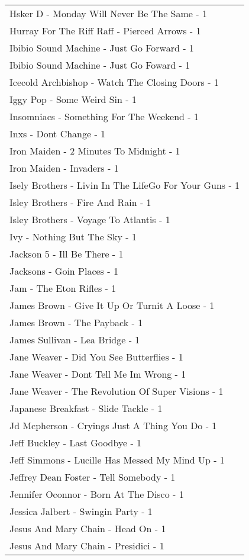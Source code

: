 \documentclass[
]{article}
\begin{document}
\begin{longtable}{l}
Hsker D - Monday Will Never Be The Same - 1 \\ 
Hurray For The Riff Raff - Pierced Arrows - 1 \\ 
Ibibio Sound Machine - Just Go Forward - 1 \\ 
Ibibio Sound Machine - Just Go Foward - 1 \\ 
Icecold Archbishop - Watch The Closing Doors - 1 \\ 
Iggy Pop - Some Weird Sin - 1 \\ 
Insomniacs - Something For The Weekend - 1 \\ 
Inxs - Dont Change - 1 \\ 
Iron Maiden - 2 Minutes To Midnight - 1 \\ 
Iron Maiden - Invaders - 1 \\ 
Isely Brothers - Livin In The LifeGo For Your Guns - 1 \\ 
Isley Brothers - Fire And Rain - 1 \\ 
Isley Brothers - Voyage To Atlantis - 1 \\ 
Ivy - Nothing But The Sky - 1 \\ 
Jackson 5 - Ill Be There - 1 \\ 
Jacksons - Goin Places - 1 \\ 
Jam - The Eton Rifles - 1 \\ 
James Brown - Give It Up Or Turnit A Loose - 1 \\ 
James Brown - The Payback - 1 \\ 
James Sullivan - Lea Bridge - 1 \\ 
Jane Weaver - Did You See Butterflies - 1 \\ 
Jane Weaver - Dont Tell Me Im Wrong - 1 \\ 
Jane Weaver - The Revolution Of Super Visions - 1 \\ 
Japanese Breakfast - Slide Tackle - 1 \\ 
Jd Mcpherson - Cryings Just A Thing You Do - 1 \\ 
Jeff Buckley - Last Goodbye - 1 \\ 
Jeff Simmons - Lucille Has Messed My Mind Up - 1 \\ 
Jeffrey Dean Foster - Tell Somebody - 1 \\ 
Jennifer Oconnor - Born At The Disco - 1 \\ 
Jessica Jalbert - Swingin Party - 1 \\ 
Jesus And Mary Chain - Head On - 1 \\ 
Jesus And Mary Chain - Presidici - 1 \\ 

\end{longtable}
\end{document}
